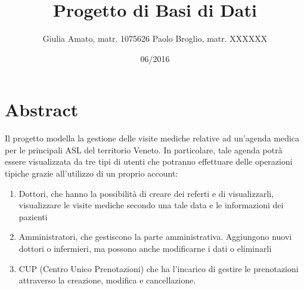 \documentclass{report}
\begin{document}
\title{Progetto di Basi di Dati}
\author{Giulia Amato, matr. 1075626  Paolo Broglio, matr. XXXXXX}
\date{06/2016}

\section*{Abstract}
Il progetto modella la gestione delle visite mediche relative ad un'agenda medica per le principali ASL del territorio Veneto. In particolare, tale agenda potrà essere visualizzata da tre tipi di utenti che potranno effettuare delle operazioni tipiche grazie all'utilizzo di un proprio account:
\begin{enumerate}
\item  Dottori, che hanno la possibilità di creare dei referti e di visualizzarli, visualizzare le visite mediche secondo una tale data e le informazioni dei pazienti
\item Amministratori, che gestiscono la parte amministrativa. Aggiungono nuovi dottori o infermieri, ma possono anche modificarne i dati o eliminarli
\item CUP (Centro Unico Prenotazioni) che ha l'incarico di gestire le prenotazioni attraverso la creazione, modifica e cancellazione.
\end{enumerate}
\end{document}
